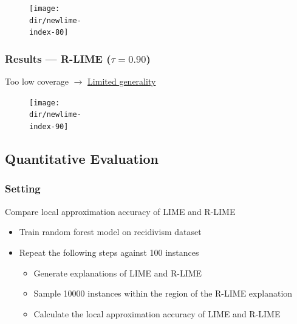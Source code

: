 \documentclass[aspectratio=169]{slide-en}
\begin{document}
{\begin{frame}{}
  \begin{figure}
    \hspace{-4.8em}
    \texttt{[image: \\dir/newlime-\\index-80]}
  \end{figure}
\end{frame}

\subsubsection{Results --- R-LIME ($\tau=0.90$)}
\begin{frame}{}
  Too low coverage $\rightarrow$ \underline{Limited generality}
  \begin{figure}
    \hspace{-2.3em}
    \texttt{[image: \\dir/newlime-\\index-90]}
  \end{figure}
\end{frame}
}

\subsection{Quantitative Evaluation}

\subsubsection{Setting}

\begin{frame}{}
  Compare local approximation accuracy of LIME and R-LIME
  \begin{itemize}
    \item Train random forest model on recidivism dataset
    \item Repeat the following steps against 100 instances
          \begin{itemize}
            \item Generate explanations of LIME and R-LIME
            \item Sample 10000 instances within the region of
                  the R-LIME explanation
            \item Calculate the local approximation accuracy of LIME and R-LIME
          \end{itemize}
  \end{itemize}
\end{frame}
\end{document}
